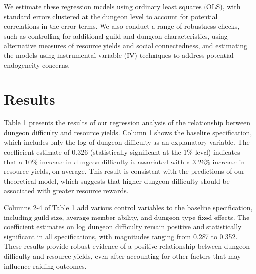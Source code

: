 \documentclass[12pt, a4paper]{article}
\begin{document}
We estimate these regression models using ordinary least squares (OLS), with standard errors clustered at the dungeon level to account for potential correlations in the error terms. We also conduct a range of robustness checks, such as controlling for additional guild and dungeon characteristics, using alternative measures of resource yields and social connectedness, and estimating the models using instrumental variable (IV) techniques to address potential endogeneity concerns.

\section{Results}
Table 1 presents the results of our regression analysis of the relationship between dungeon difficulty and resource yields. Column 1 shows the baseline specification, which includes only the log of dungeon difficulty as an explanatory variable. The coefficient estimate of 0.326 (statistically significant at the 1\% level) indicates that a 10\% increase in dungeon difficulty is associated with a 3.26\% increase in resource yields, on average. This result is consistent with the predictions of our theoretical model, which suggests that higher dungeon difficulty should be associated with greater resource rewards.

Columns 2-4 of Table 1 add various control variables to the baseline specification, including guild size, average member ability, and dungeon type fixed effects. The coefficient estimates on log dungeon difficulty remain positive and statistically significant in all specifications, with magnitudes ranging from 0.287 to 0.352. These results provide robust evidence of a positive relationship between dungeon difficulty and resource yields, even after accounting for other factors that may influence raiding outcomes.
\end{document}
